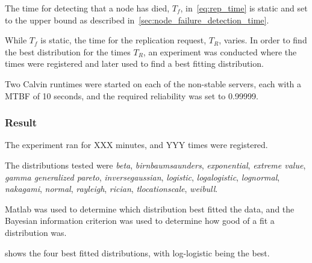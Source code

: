\documentclass{cslthse-msc}
\begin{document}
The time for detecting that a node has died, $T_f$, in~\cref{eq:rep_time} is static and set to the upper bound as described in~\cref{sec:node_failure_detection_time}.

While $T_f$ is static, the time for the replication request, $T_R$, varies. In order to find the best distribution for the times $T_R$, an experiment was conducted where the times were registered and later used to find a best fitting distribution.

Two Calvin runtimes were started on each of the non-stable servers, each with a MTBF of 10 seconds, and the required reliability was set to 0.99999.

\subsubsection*{Result}
The experiment ran for XXX minutes, and YYY times were registered.

The distributions tested were \emph{beta}, \emph{birnbaumsaunders}, \emph{exponential}, \emph{extreme value}, \emph{gamma generalized pareto}, \emph{inversegaussian}, \emph{logistic}, \emph{logalogistic}, \emph{lognormal}, \emph{nakagami}, \emph{normal}, \emph{rayleigh}, \emph{rician}, \emph{tlocationscale}, \emph{weibull}.

Matlab was used to determine which distribution best fitted the data, and the Bayesian information criterion was used to determine how good of a fit a distribution was.

 shows the four best fitted distributions, with log-logistic being the best.
\end{document}

